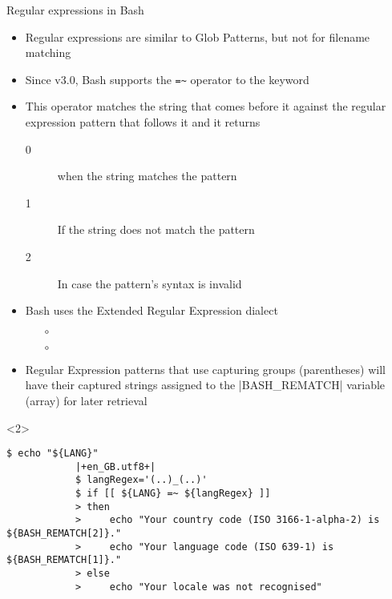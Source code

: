 \begin{frame}[fragile]{Regular expressions in Bash}
    \vspace{-3mm}
    \begin{itemize}[<only@1>]
        \item Regular expressions are similar to Glob Patterns, but not for filename matching
        \item Since v3.0, Bash supports the \texttt{=\textasciitilde} operator to the \bash{[[} keyword
        \item This operator matches the string that comes before it against the regular expression pattern that follows it and it returns
              \begin{description}
                  \item[0] when the string matches the pattern
                  \item[1] If the string does not match the pattern
                  \item[2] In case the pattern's syntax is invalid
              \end{description}
        \item Bash uses the Extended Regular Expression dialect
              \begin{itemize}
                  \item[$\circ$] 
                  \item[$\circ$] 
              \end{itemize}
        \item Regular Expression patterns that use capturing groups (parentheses) will have their captured strings assigned to the \bash|BASH_REMATCH| variable (array) for later retrieval
    \end{itemize}
    \begin{onlyenv}<2>
        \begin{lstlisting}[style=MyBash, style=oddnumbers, style=smaller]
            $ echo "${LANG}"
            |+en_GB.utf8+|
            $ langRegex='(..)_(..)'
            $ if [[ ${LANG} =~ ${langRegex} ]]
            > then
            >     echo "Your country code (ISO 3166-1-alpha-2) is ${BASH_REMATCH[2]}."
            >     echo "Your language code (ISO 639-1) is ${BASH_REMATCH[1]}."
            > else
            >     echo "Your locale was not recognised"

\end{lstlisting}
\end{onlyenv}
\end{frame}
